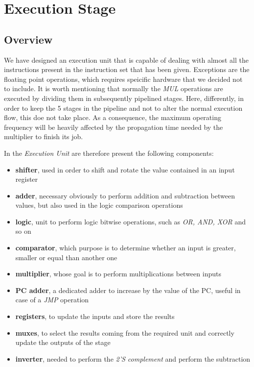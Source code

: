 \section{Execution Stage}
\label{chap_exu}

\subsection{Overview}
We have designed an execution unit that is capable of dealing with almost all the instructions present in the instruction set that has been given. Exceptions are the floating point operations, which requires speicific hardware that we decided not to include. It is worth mentioning that normally the \textit{MUL} operations are executed by dividing them in subsequently pipelined stages. Here, differently, in order to keep the 5 stages in the pipeline and not to alter the normal execution flow, this doe not take place. As a consequence, the maximum operating frequency will be heavily affected by the propagation time needed by the multiplier to finish its job.


In the \textit{Execution Unit} are therefore present the following components:
\begin{itemize}
	\item \textbf{shifter}, used in order to shift and rotate the value contained in an input register
	\item \textbf{adder}, necessary obviously to perform addition and subtraction between values, but also used in the logic comparison operations
	\item \textbf{logic}, unit to perform logic bitwise operations, such as \textit{OR, AND, XOR} and so on
	\item \textbf{comparator}, which purpose is to determine whether an input is greater, smaller or equal than another one
	\item \textbf{multiplier}, whose goal is to perform multiplications between inputs
	\item \textbf{PC adder}, a dedicated adder to increase by the value of the 
	PC, useful in case of a \textit{JMP} operation
	\item \textbf{registers}, to update the inputs and store the results
	\item \textbf{muxes}, to select the results coming from the required unit and correctly update the outputs of the stage
	\item \textbf{inverter}, needed to perform the \textit{2'S complement} and perform the subtraction
\end{itemize}


